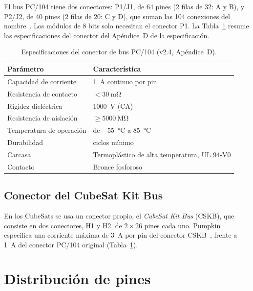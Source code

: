 El bus PC/104 tiene dos conectores: P1/J1, de 64 pines (2 filas de 32: A y B), y P2/J2, de 40 pines (2 filas de 20: C y D), que suman las 104 conexiones del nombre~\cite[Sec.~1 y Apéndice~B]{pc104v24}. Los módulos de 8 bits solo necesitan el conector P1. La Tabla~\ref{tab:pc104-conector-esp} resume las especificaciones del conector del Apéndice~D de la especificación.

\begin{table}[H]
  \centering
  \begin{tabular}{@{}>{\raggedright\arraybackslash}p{5.5cm}>{\raggedright\arraybackslash}p{9cm}@{}}
    \toprule
    Parámetro & Característica \\
    \midrule
    Capacidad de corriente & \SI{1}{\ampere} continuo por pin \\
    Resistencia de contacto & $<\SI{30}{\milli\ohm}$ \\
    Rigidez dieléctrica & \SI{1000}{\volt} (CA) \\
    Resistencia de aislación & $\geq \SI{5000}{\mega\ohm}$ \\
    Temperatura de operación & de \SI{-55}{\celsius} a \SI{+85}{\celsius} \\
    Durabilidad & 50 ciclos mínimo \\
    Carcasa & Termoplástico de alta temperatura, UL 94-V0 \\
    Contacto & Bronce fosforoso \\
    \bottomrule
  \end{tabular}
  \caption[Especificaciones del conector de bus PC/104]{Especificaciones del conector de bus PC/104 (v2.4, Apéndice~D).}\label{tab:pc104-conector-esp}
\end{table}

\subsection{Conector del CubeSat Kit Bus}\label{subsec:pc104-cskb}

En los CubeSats se usa un conector propio, el \emph{CubeSat Kit Bus} (CSKB), que consiste en dos conectores, H1 y H2, de $2\times 26$ pines cada uno. Pumpkin especifica una corriente máxima de \SI{3}{\ampere} por pin del conector CSKB~\cite{pumpkinmb}, frente a \SI{1}{\ampere} del conector PC/104 original (Tabla~\ref{tab:pc104-conector-esp}).

\section{Distribución de pines}\label{sec:pc104-pines}

